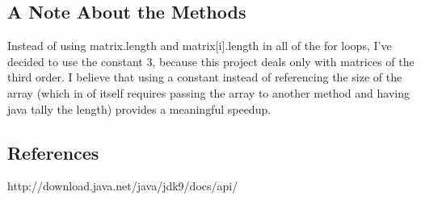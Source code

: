 \documentclass[12pt]{article}
\begin{document}
\subsection{A Note About the Methods}
Instead of using matrix.length and matrix[i].length in all of the for loops, I've decided to use the constant 3, because this project deals only with matrices of the third order. I believe that using a constant instead of referencing the size of the array (which in of itself requires passing the array to another method and having java tally the length) provides a meaningful speedup.




\newpage %



\begin{center}
\section*{References}
\end{center}
http://download.java.net/java/jdk9/docs/api/
\end{document}
